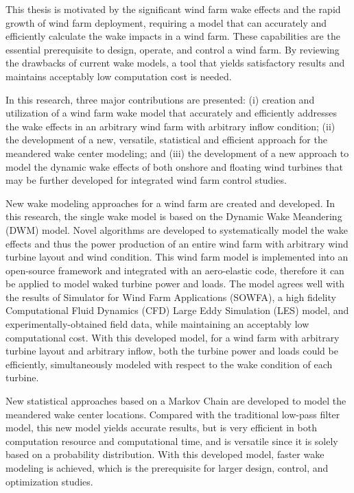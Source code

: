 \documentclass{umthesis}
\begin{document}
This thesis is motivated by the significant wind farm wake effects and the rapid growth of wind farm deployment, requiring a model that can accurately and efficiently calculate the wake impacts in a wind farm. These capabilities are the essential prerequisite to design, operate, and control a wind farm. By reviewing the drawbacks of current wake models, a tool that yields satisfactory results and maintains acceptably low computation cost is needed.

In this research, three major contributions are presented: (i) creation and utilization of a wind farm wake model that accurately and efficiently addresses the wake effects in an arbitrary wind farm with arbitrary inflow condition; (ii) the development of a new, versatile, statistical and efficient approach for the meandered wake center modeling; and (iii) the development of a new approach to model the dynamic wake effects of both onshore and floating wind turbines that may be further developed for integrated wind farm control studies.

New wake modeling approaches for a wind farm are created and developed. In this research, the single wake model is based on the Dynamic Wake Meandering (DWM) model. Novel algorithms are developed to systematically model the wake effects and thus the power production of an entire wind farm with arbitrary wind turbine layout and wind condition. This wind farm model is implemented into an open-source framework and integrated with an aero-elastic code, therefore it can be applied to model waked turbine power and loads. The model agrees well with the results of Simulator for Wind Farm Applications (SOWFA), a high fidelity Computational Fluid Dynamics (CFD) Large Eddy Simulation (LES) model, and experimentally-obtained field data, while maintaining an acceptably low computational cost. With this developed model, for a wind farm with arbitrary turbine layout and arbitrary inflow, both the turbine power and loads could be efficiently, simultaneously modeled with respect to the wake condition of each turbine.  

New statistical approaches based on a Markov Chain are developed to model the meandered wake center locations. Compared with the traditional low-pass filter model, this new model yields accurate results, but is very efficient in both computation resource and computational time, and is versatile since it is solely based on a probability distribution. With this developed model, faster wake modeling is achieved, which is the prerequisite for larger design, control, and optimization studies.
\end{document}
